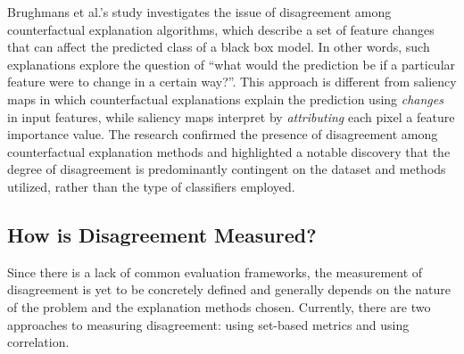 Brughmans et al.'s study \cite{disagreementCounterfactual} investigates the issue of disagreement among counterfactual explanation algorithms, which describe a set of feature changes that can affect the predicted class of a black box model. In other words, such explanations explore the question of ``what would the prediction be if a particular feature were to change in a certain way?''. This approach is different from saliency maps in which counterfactual explanations explain the prediction using \emph{changes} in input features, while saliency maps interpret by \emph{attributing} each pixel a feature importance value. The research confirmed the presence of disagreement among counterfactual explanation methods and highlighted a notable discovery that the degree of disagreement is predominantly contingent on the dataset and methods utilized, rather than the type of classifiers employed.

\begin{table}[htbp]
\end{table}


\subsection{How is Disagreement Measured?}
\label{subsec:howIsDisagreementMeasured}
Since there is a lack of common evaluation frameworks, the measurement of disagreement is yet to be concretely defined and generally depends on the nature of the problem and the explanation methods chosen. Currently, there are two approaches to measuring disagreement: using set-based metrics and using correlation.

